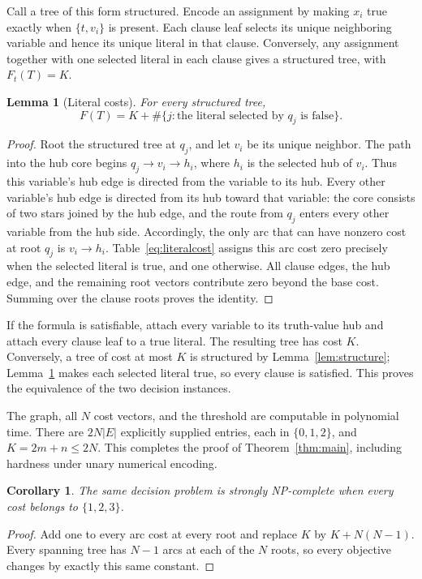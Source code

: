 \documentclass[11pt]{article}
\newtheorem{lemma}{Lemma}
\newtheorem{corollary}{Corollary}
\begin{document}
Call a tree of this form structured. Encode an assignment by making $x_i$
true exactly when $\{t,v_i\}$ is present. Each clause leaf selects its
unique neighboring variable and hence its unique literal in that clause.
Conversely, any assignment together with one selected literal in each
clause gives a structured tree, with $F_t(T)=K$.

\begin{lemma}[Literal costs]\label{lem:literal}
For every structured tree,
\begin{equation}\label{eq:structured}
 F(T)=K+\#\{j:\text{the literal selected by }q_j\text{ is false}\}.
\end{equation}
\end{lemma}
\begin{proof}
Root the structured tree at $q_j$, and let $v_i$ be its unique neighbor.
The path into the hub core begins $q_j\to v_i\to h_i$, where $h_i$ is
the selected hub of $v_i$. Thus this variable's hub edge is directed
from the variable to its hub. Every other variable's hub edge is
directed from its hub toward that variable: the core consists of two
stars joined by the hub edge, and the route from $q_j$ enters every
other variable from the hub side. Accordingly, the only arc that can
have nonzero cost at root $q_j$ is $v_i\to h_i$.
Table~\eqref{eq:literalcost} assigns this arc cost zero precisely when
the selected literal is true, and one otherwise. All clause edges,
the hub edge, and the remaining root vectors contribute zero beyond
the base cost. Summing over the clause roots proves the identity.
\end{proof}

If the formula is satisfiable, attach every variable to its truth-value
hub and attach every clause leaf to a true literal. The resulting tree
has cost $K$. Conversely, a tree of cost at most $K$ is structured by
Lemma~\ref{lem:structure}; Lemma~\ref{lem:literal} makes each selected
literal true, so every clause is satisfied. This proves the equivalence
of the two decision instances.

The graph, all $N$ cost vectors, and the threshold are computable in
polynomial time. There are $2N|E|$ explicitly supplied entries, each in
$\{0,1,2\}$, and $K=2m+n\leq 2N$. This completes the proof of
Theorem~\ref{thm:main}, including hardness under unary numerical encoding.

\begin{corollary}\label{cor:positive}
The same decision problem is strongly NP-complete when every cost belongs
to $\{1,2,3\}$.
\end{corollary}
\begin{proof}
Add one to every arc cost at every root and replace $K$ by
$K+N(N-1)$. Every spanning tree has $N-1$ arcs at each of the $N$ roots,
so every objective changes by exactly this same constant.
\end{proof}
\end{document}
